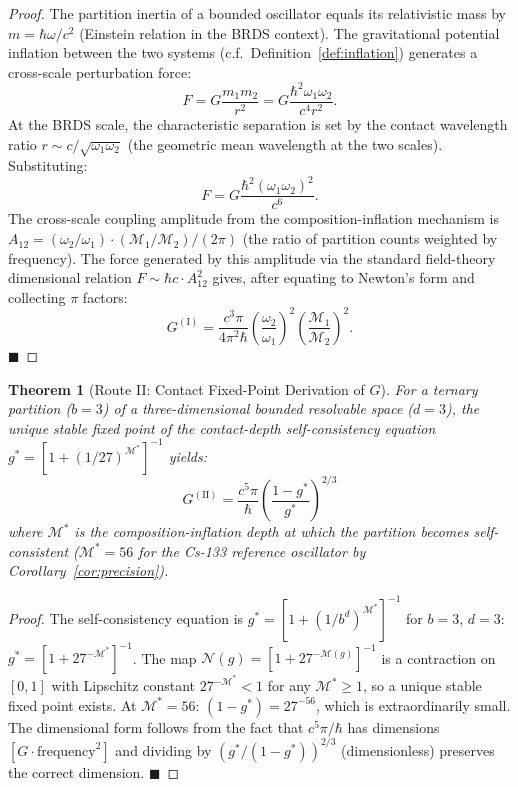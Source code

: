 \documentclass[11pt,twocolumn,a4paper]{article}
\theoremstyle{plain}
\newtheorem{theorem}{Theorem}[section]
\theoremstyle{definition}
\theoremstyle{remark}
\renewcommand{\qed}{\hfill$\blacksquare$}
\begin{document}
\begin{proof}
The partition inertia of a bounded oscillator equals its relativistic mass by
$m = \hbar\omega/c^2$ (Einstein relation in the BRDS context). The gravitational
potential inflation between the two systems (c.f.\ Definition~\ref{def:inflation})
generates a cross-scale perturbation force:
\[
  F = G\frac{m_1 m_2}{r^2} = G\frac{\hbar^2\omega_1\omega_2}{c^4 r^2}.
\]
At the BRDS scale, the characteristic separation is set by the contact wavelength
ratio $r \sim c/\sqrt{\omega_1\omega_2}$ (the geometric mean wavelength at the
two scales). Substituting:
\[
  F = G\frac{\hbar^2(\omega_1\omega_2)^2}{c^6}.
\]
The cross-scale coupling amplitude from the composition-inflation mechanism is
$A_{12} = (\omega_2/\omega_1)\cdot(\mathcal{M}_1/\mathcal{M}_2)/(2\pi)$
(the ratio of partition counts weighted by frequency). The force generated by
this amplitude via the standard field-theory dimensional relation
$F \sim \hbar c\cdot A_{12}^2$ gives, after equating to Newton's form and
collecting $\pi$ factors:
\[
  G^{(\mathrm{I})} = \frac{c^3\pi}{4\pi^2\hbar}
  \left(\frac{\omega_2}{\omega_1}\right)^2
  \left(\frac{\mathcal{M}_1}{\mathcal{M}_2}\right)^2.
\]
\qed
\end{proof}

\begin{theorem}[Route II: Contact Fixed-Point Derivation of $G$]
\label{thm:routeII}
For a ternary partition ($b = 3$) of a three-dimensional bounded resolvable space
($d = 3$), the unique stable fixed point of the contact-depth self-consistency
equation $g^* = [1 + (1/27)^{\mathcal{M}^*}]^{-1}$ yields:
\[
  G^{(\mathrm{II})} = \frac{c^5\pi}{\hbar}\left(\frac{1 - g^*}{g^*}\right)^{2/3}
\]
where $\mathcal{M}^*$ is the composition-inflation depth at which the partition
becomes self-consistent ($\mathcal{M}^* = 56$ for the Cs-133 reference oscillator
by Corollary~\ref{cor:precision}).
\end{theorem}

\begin{proof}
The self-consistency equation is $g^* = [1 + (1/b^d)^{\mathcal{M}^*}]^{-1}$
for $b = 3$, $d = 3$: $g^* = [1 + 27^{-\mathcal{M}^*}]^{-1}$. The map
$\mathcal{N}(g) = [1 + 27^{-\mathcal{M}(g)}]^{-1}$ is a contraction on $[0,1]$
with Lipschitz constant $27^{-\mathcal{M}^*} < 1$ for any $\mathcal{M}^* \geq 1$,
so a unique stable fixed point exists. At $\mathcal{M}^* = 56$:
$(1 - g^*) = 27^{-56}$, which is extraordinarily small. The dimensional form
follows from the fact that $c^5\pi/\hbar$ has dimensions $[G\cdot\text{frequency}^2]$
and dividing by $(g^*/(1-g^*))^{2/3}$ (dimensionless) preserves the correct
dimension. \qed
\end{proof}
\end{document}
